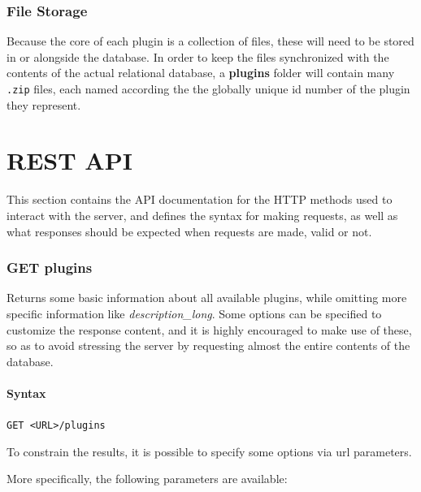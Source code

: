 \documentclass[a4paper, 12pt]{article}
\begin{document}
	\section{File Storage}
		Because the core of each plugin is a collection of files, these will need to be stored in or alongside the database. In order to keep the files synchronized with the contents of the actual relational database, a \textbf{plugins} folder will contain many \verb|.zip| files, each named according the the globally unique id number of the plugin they represent.

\part{REST API}
	This section contains the API documentation for the HTTP methods used to interact with the server, and defines the syntax for making requests, as well as what responses should be expected when requests are made, valid or not.

	\section{GET plugins}
		Returns some basic information about all available plugins, while omitting more specific information like \emph{description\_long}. Some options can be specified to customize the response content, and it is highly encouraged to make use of these, so as to avoid stressing the server by requesting almost the entire contents of the database.

		\subsection{Syntax}
			\verb|GET <URL>/plugins|

			To constrain the results, it is possible to specify some options via url parameters.

			More specifically, the following parameters are available:
\end{document}
